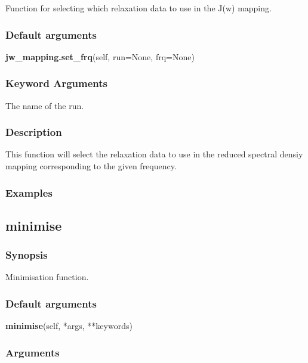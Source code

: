 Function for selecting which relaxation data to use in the J(w) mapping.

\subsubsection{Default arguments}

\textsf{\textbf{jw\_mapping.set\_frq}(self, run=None, frq=None)}


\subsubsection{Keyword Arguments}

  The name of the run.


\subsubsection{Description}

This function will select the relaxation data to use in the reduced spectral densiy mapping
corresponding to the given frequency.


\subsubsection{Examples}




\newpage

\subsection{minimise}


\subsubsection{Synopsis}

Minimisation function.

\subsubsection{Default arguments}

\textsf{\textbf{minimise}(self, *args, **keywords)}


\subsubsection{Arguments}

